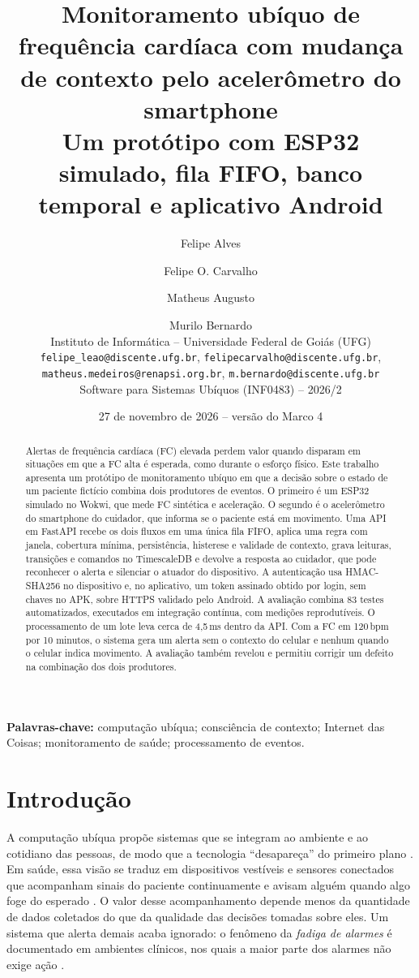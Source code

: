 \documentclass[12pt,a4paper]{article}
\title{\textbf{Monitoramento ubíquo de frequência cardíaca com mudança de contexto pelo acelerômetro do smartphone}\\[4pt]
\large Um protótipo com ESP32 simulado, fila FIFO, banco temporal e aplicativo Android}
\author{Felipe Alves \and Felipe O. Carvalho \and Matheus Augusto \and Murilo Bernardo\\[4pt]
\small Instituto de Informática -- Universidade Federal de Goiás (UFG)\\
\footnotesize\texttt{felipe\_leao@discente.ufg.br}, \texttt{felipecarvalho@discente.ufg.br},\\
\footnotesize\texttt{matheus.medeiros@renapsi.org.br}, \texttt{m.bernardo@discente.ufg.br}\\[2pt]
\small Software para Sistemas Ubíquos (INF0483) -- 2026/2}
\date{27 de novembro de 2026 -- versão do Marco 4}
\begin{document}
\maketitle

\begin{abstract}
\noindent
Alertas de frequência cardíaca (FC) elevada perdem valor quando disparam em situações em que a FC alta é esperada, como durante o esforço físico.
Este trabalho apresenta um protótipo de monitoramento ubíquo em que a decisão sobre o estado de um paciente fictício combina dois produtores de eventos.
O primeiro é um ESP32 simulado no Wokwi, que mede FC sintética e aceleração.
O segundo é o acelerômetro do smartphone do cuidador, que informa se o paciente está em movimento.
Uma API em FastAPI recebe os dois fluxos em uma única fila FIFO, aplica uma regra com janela, cobertura mínima, persistência, histerese e validade de contexto, grava leituras, transições e comandos no TimescaleDB e devolve a resposta ao cuidador, que pode reconhecer o alerta e silenciar o atuador do dispositivo.
A autenticação usa HMAC-SHA256 no dispositivo e, no aplicativo, um token assinado obtido por login, sem chaves no APK, sobre HTTPS validado pelo Android.
A avaliação combina 83 testes automatizados, executados em integração contínua, com medições reprodutíveis.
O processamento de um lote leva cerca de 4,5\,ms dentro da API.
Com a FC em 120\,bpm por 10 minutos, o sistema gera um alerta sem o contexto do celular e nenhum quando o celular indica movimento.
A avaliação também revelou e permitiu corrigir um defeito na combinação dos dois produtores.
\end{abstract}

\noindent\textbf{Palavras-chave:} computação ubíqua; consciência de contexto; Internet das Coisas; monitoramento de saúde; processamento de eventos.

\section{Introdução}

A computação ubíqua propõe sistemas que se integram ao ambiente e ao cotidiano das pessoas, de modo que a tecnologia ``desapareça'' do primeiro plano \cite{weiser1991}.
Em saúde, essa visão se traduz em dispositivos vestíveis e sensores conectados que acompanham sinais do paciente continuamente e avisam alguém quando algo foge do esperado \cite{islam2015}.
O valor desse acompanhamento depende menos da quantidade de dados coletados do que da qualidade das decisões tomadas sobre eles.
Um sistema que alerta demais acaba ignorado: o fenômeno da \emph{fadiga de alarmes} é documentado em ambientes clínicos, nos quais a maior parte dos alarmes não exige ação \cite{sendelbach2013}.
\end{document}
